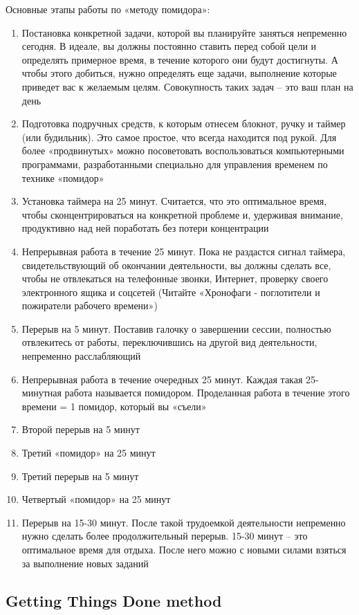 \documentclass{../industrial-development}
\begin{document}
Основные этапы работы по «методу помидора»:
\begin{enumerate}
  \item Постановка конкретной задачи, которой вы планируйте заняться непременно сегодня. В идеале, вы должны постоянно ставить перед собой цели и определять примерное время, в течение которого они будут достигнуты. А чтобы этого добиться, нужно определять еще задачи,  выполнение которые приведет вас к желаемым целям.  Совокупность таких задач – это ваш план на день
  \item Подготовка подручных средств, к которым отнесем блокнот, ручку и таймер (или будильник). Это самое простое, что всегда находится под рукой. Для более «продвинутых» можно посоветовать воспользоваться компьютерными программами, разработанными специально для управления временем по технике «помидор»
  \item Установка таймера на 25 минут. Считается, что это оптимальное время, чтобы сконцентрироваться на конкретной проблеме и, удерживая внимание, продуктивно над ней поработать без потери концентрации
  \item Непрерывная работа в течение 25 минут. Пока не раздастся сигнал таймера, свидетельствующий об окончании деятельности, вы должны сделать все, чтобы не отвлекаться на телефонные звонки, Интернет, проверку своего электронного ящика и соцсетей (Читайте «Хронофаги - поглотители и пожиратели рабочего времени»)
  \item Перерыв на 5 минут. Поставив галочку о завершении сессии, полностью отвлекитесь от работы, переключившись на другой вид деятельности, непременно расслабляющий
  \item Непрерывная работа в течение очередных 25 минут. Каждая такая 25-минутная работа называется помидором. Проделанная работа в течение этого времени = 1 помидор, который вы «съели»
  \item Второй перерыв на 5 минут
  \item Третий «помидор» на 25 минут
  \item Третий перерыв на 5 минут
  \item Четвертый «помидор» на 25 минут
  \item Перерыв на 15-30 минут. После такой трудоемкой деятельности непременно нужно сделать более продолжительный перерыв. 15-30 минут – это оптимальное время для отдыха. После него можно с новыми силами взяться за выполнение новых заданий~\cite{Pomidoro}
\end{enumerate}

\subsection{Getting Things Done method}
\end{document}
